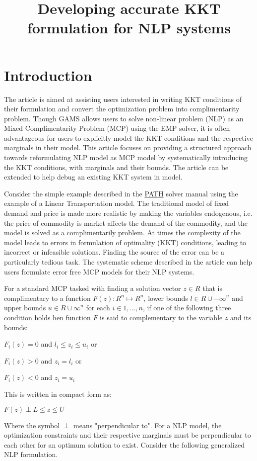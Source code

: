 \documentclass{article}
\title{Developing accurate KKT formulation for NLP systems}
\begin{document}
\section{Introduction}

The article is aimed at assisting users interested in writing KKT conditions of their formulation and convert the optimization problem into
complimentarity problem. Though GAMS allows users to solve non-linear problem (NLP) as an Mixed Complimentarity Problem (MCP) using the
EMP solver, it is often advantageous for users to explicitly model the KKT conditions and the respective marginals in their model.
This article focuses on providing a structured approach towards reformulating NLP model as MCP model by systematically introducing the KKT
conditions, with marginals and their bounds. The article can be extended to help debug an existing KKT system in model.


Consider the simple example described in the \href{https://www.gams.com/latest/docs/S_PATH.html}{PATH} solver manual using the example of a Linear Transportation model.
The traditional model of fixed demand and price is made more realistic by making the variables endogenous, i.e. the price of commodity is market affects the demand of the
commodity, and the model is solved as a complimentarily problem.  At times the complexity of the model leads to errors in formulation of optimality (KKT) conditions,
leading to incorrect or infeasible solutions. Finding the source of the error can be a particularly tedious task. The systematic scheme described in the article can
help users formulate error free MCP models for their NLP systems.

For a standard MCP tasked with finding a solution vector  $z \in \!R$ that is complimentary to a function $F(z) : {\!R}^n \mapsto {\!R}^n$,
lower bounds $ l \in { \!R \cup {-\infty}}^n$ and upper bounds $ u \in { \!R \cup {\infty}}^n$ for each $ i \in {1,...,n}$, if one of the following three
condition holds hen function $F$ is said to complementary to the variable $z$ and its bounds:

 \centerline{$F_{i}(z) = 0$  and  $ l_i \leq z_i \leq u_i $   or}
 \centerline{$F_{i}(z) > 0$  and  $ z_i = l_i$  or }
 \centerline{ $F_{i}(z) < 0$  and  $ z_i = u_i$ }

\noindent This is written in compact form as:
\centerline{ $ F(z) \perp L \leq z \leq U $ }
\par
\noindent Where the symbol $\perp$ means "perpendicular to". For a NLP model, the optimization constraints and their respective marginals must be
perpendicular to each other for an optimum solution to exist. Consider the following generalized NLP formulation.
\end{document}
